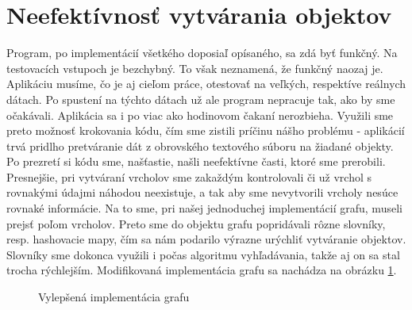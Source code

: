 \section{Neefektívnosť vytvárania objektov}

Program, po implementácií všetkého doposiaľ opísaného, sa zdá byť funkčný. Na testovacích vstupoch je bezchybný. To však neznamená, že funkčný naozaj je. Aplikáciu musíme, čo je aj cieľom práce, otestovať na veľkých, respektíve reálnych dátach. Po spustení na týchto dátach už ale program nepracuje tak, ako by sme očakávali. Aplikácia sa i po viac ako hodinovom čakaní nerozbieha. Využili sme preto možnosť krokovania kódu, čím sme zistili príčinu nášho problému - aplikácií trvá pridlho pretváranie dát z obrovského textového súboru na žiadané objekty. Po prezretí si kódu sme, našťastie, našli neefektívne časti, ktoré sme prerobili. Presnejšie, pri vytváraní vrcholov sme zakaždým kontrolovali či už vrchol s rovnakými údajmi náhodou neexistuje, a tak aby sme nevytvorili vrcholy nesúce rovnaké informácie. Na to sme, pri našej jednoduchej implementácií grafu, museli prejsť poľom vrcholov. Preto sme do objektu grafu popridávali rôzne slovníky, resp. hashovacie mapy, čím sa nám podarilo výrazne urýchliť vytváranie objektov. Slovníky sme dokonca využili i počas algoritmu vyhľadávania, takže aj on sa stal trocha rýchlejším. Modifikovaná implementácia grafu sa nachádza na obrázku \ref{4_Graph}.\newline

\begin{figure}[H]
  \caption{Vylepšená implementácia grafu}
  \label{4_Graph}
\end{figure}

